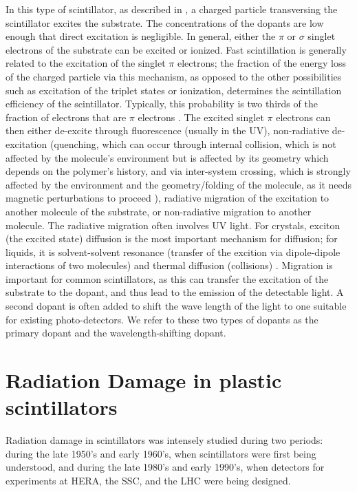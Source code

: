 In this type of scintillator, as described in \cite{birks}, 
a charged particle transversing the scintillator
excites the substrate.  The concentrations of the 
dopants are low enough that direct excitation is negligible.
In general, either the $\pi$ or $\sigma$ singlet electrons of the substrate
can be excited or ionized. 
Fast scintillation is generally related
to the excitation of the singlet $\pi$ electrons; the fraction
of the energy loss of the charged particle via this mechanism,
as opposed to the other possibilities such as excitation of
the triplet states or ionization, determines the scintillation
efficiency of the scintillator.  Typically, this probability is
two thirds of the fraction of electrons that are $\pi$ electrons \cite{birks}.
The excited singlet $\pi$ electrons can then either de-excite
through fluorescence (usually in the UV), 
non-radiative de-excitation (quenching, which can occur through internal collision, which is not affected by the molecule's environment
but is affected by its geometry which depends on the
polymer's history, and 
via inter-system crossing, which is strongly affected by 
the environment and the geometry/folding of the molecule,
as it needs magnetic perturbations to proceed \cite{brown}),
radiative migration of the excitation to another molecule
of the substrate, or non-radiative migration
to another molecule.  The radiative migration often involves UV light.
For crystals, exciton (the excited state)
diffusion  is the most important mechanism for
diffusion; for liquids, it is solvent-solvent resonance (transfer of the
excition via dipole-dipole interactions of two molecules)
and thermal diffusion (collisions)
\cite{birks}.
Migration is important for common scintillators, as this can transfer
the excitation of the substrate to the dopant, and 
thus lead to the emission
of the detectable light.  A second dopant is often added to
shift the wave length of 
the light to one suitable for existing photo-detectors.
We refer to these two types of dopants 
as the primary dopant and the wavelength-shifting dopant.


\section{Radiation Damage in plastic scintillators}
Radiation damage
in scintillators was intensely studied during two periods:
during the late 1950's and early 1960's, when
scintillators were first being understood, and during the late 1980's
and early 1990's, when detectors for experiments at HERA, the SSC,
and the LHC were being designed.

